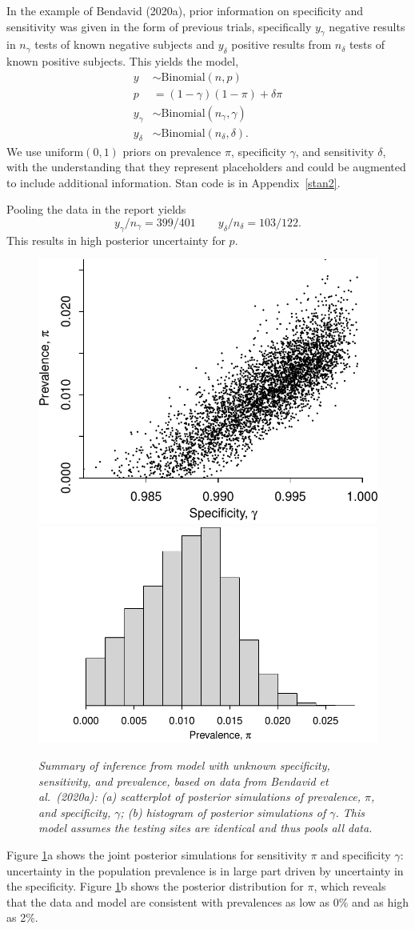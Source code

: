 \documentclass[11pt]{article}
\begin{document}
In the example of Bendavid (2020a), prior information on specificity
and sensitivity was given in the form of previous trials, specifically
$y_{\gamma}$ negative results in $n_{\gamma}$ tests of known negative
subjects and $y_{\delta}$ positive results from $n_{\delta}$ tests of
known positive subjects.  This yields the model,
%
\begin{align*}
   y & \sim \mbox{Binomial} (n, p)\\
  p & = (1-\gamma)(1- \pi)+ \delta\pi\\
   y_{\gamma} & \sim \mbox{Binomial} (n_{\gamma}, \gamma)\\
   y_{\delta} & \sim \mbox{Binomial} (n_{\delta}, \delta).
\end{align*}
%
We use $\mbox{uniform}(0,1)$ priors on prevalence $\pi$, specificity
$\gamma$, and sensitivity $\delta$, with the understanding that they
represent placeholders and could be augmented to include additional
information.  Stan code is in Appendix~\ref{stan2}.

Pooling the data in the report yields
%
\begin{equation*}
  y_{\gamma}/n_{\gamma}=399/401 \qquad y_{\delta}/n_{\delta}=103/122.
\end{equation*}
%
This results in high posterior uncertainty for $p$.   
%
\begin{figure}
  \centerline{ \includegraphics[width=.45\textwidth]{img/scatter.pdf}
    \includegraphics[width=.55\textwidth]{img/hist.pdf}}
  \caption{\em Summary of inference from model with unknown
    specificity, sensitivity, and prevalence, based on data from
    Bendavid et al.\ (2020a): (a) scatterplot of posterior simulations
    of prevalence, $\pi$, and specificity, $\gamma$; (b) histogram of
    posterior simulations of $\gamma$.  This model assumes the testing
    sites are identical and thus pools all data.}
\label{posterior1}
\end{figure}
%
Figure \ref{posterior1}a shows the joint posterior simulations for
sensitivity $\pi$ and specificity $\gamma$: uncertainty in the
population prevalence is in large part driven by uncertainty in the
specificity.  Figure \ref{posterior1}b shows the posterior
distribution for $\pi$, which reveals that the data and model are
consistent with prevalences as low as 0\% and as high as 2\%.
\end{document}
